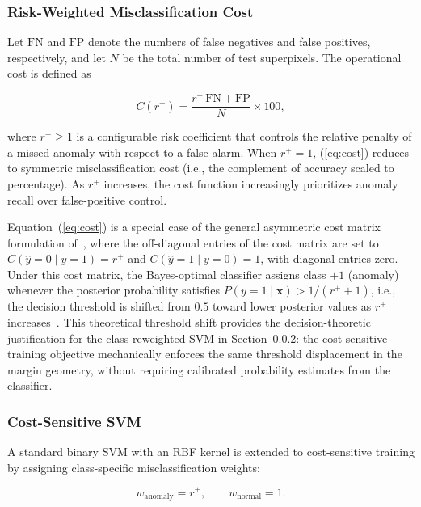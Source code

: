 \documentclass[lettersize,journal]{IEEEtran}
\begin{document}
\subsubsection{Risk-Weighted Misclassification Cost}

Let $\mathrm{FN}$ and $\mathrm{FP}$ denote the numbers of false
negatives and false positives, respectively, and let $N$ be the total
number of test superpixels. The operational cost is defined as

\begin{equation}
    C(r^{+}) = \frac{r^{+}\,\mathrm{FN} + \mathrm{FP}}{N} \times 100,
    \label{eq:cost}
\end{equation}

\noindent where $r^{+} \geq 1$ is a configurable risk coefficient that
controls the relative penalty of a missed anomaly with respect to a
false alarm. When $r^{+} = 1$, (\ref{eq:cost}) reduces to symmetric
misclassification cost (i.e., the complement of accuracy scaled to
percentage). As $r^{+}$ increases, the cost function increasingly
prioritizes anomaly recall over false-positive control.

Equation~(\ref{eq:cost}) is a special case of the general
asymmetric cost matrix formulation of~\cite{elkan2001foundations},
where the off-diagonal entries of the cost matrix are set to
$C(\hat{y}=0 \mid y=1) = r^{+}$ and $C(\hat{y}=1 \mid y=0) = 1$,
with diagonal entries zero. Under this cost matrix, the Bayes-optimal
classifier assigns class $+1$ (anomaly) whenever the posterior
probability satisfies $P(y=1 \mid \mathbf{x}) > 1/(r^{+}+1)$,
i.e., the decision threshold is shifted from $0.5$ toward lower
posterior values as $r^{+}$ increases~\cite{elkan2001foundations}.
This theoretical threshold shift provides the decision-theoretic
justification for the class-reweighted SVM in Section~\ref{sec:csvm}:
the cost-sensitive training objective mechanically enforces the same
threshold displacement in the margin geometry, without requiring
calibrated probability estimates from the classifier.

\subsubsection{Cost-Sensitive SVM}
\label{sec:csvm}

A standard binary SVM with an RBF kernel is extended to cost-sensitive
training by assigning class-specific misclassification weights:

\begin{equation}
    w_{\mathrm{anomaly}} = r^{+}, \qquad w_{\mathrm{normal}} = 1.
    \label{eq:weights}
\end{equation}
\end{document}
